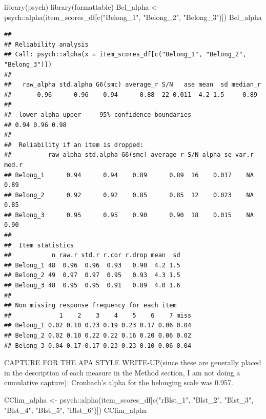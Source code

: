 \documentclass[
  11pt,
]{book}
\newenvironment{Shaded}{\begin{snugshade}}{\end{snugshade}}
\newcommand{\FunctionTok}[1]{\textcolor[rgb]{0.00,0.00,0.00}{#1}}
\newcommand{\NormalTok}[1]{#1}
\newcommand{\OtherTok}[1]{\textcolor[rgb]{0.56,0.35,0.01}{#1}}
\newcommand{\SpecialCharTok}[1]{\textcolor[rgb]{0.00,0.00,0.00}{#1}}
\newcommand{\StringTok}[1]{\textcolor[rgb]{0.31,0.60,0.02}{#1}}
\begin{document}
\begin{Shaded}
\begin{Highlighting}[]
\FunctionTok{library}\NormalTok{(psych)}
\FunctionTok{library}\NormalTok{(formattable)}
\NormalTok{Bel\_alpha }\OtherTok{\textless{}{-}}\NormalTok{ psych}\SpecialCharTok{::}\FunctionTok{alpha}\NormalTok{(item\_scores\_df[}\FunctionTok{c}\NormalTok{(}\StringTok{"Belong\_1"}\NormalTok{, }\StringTok{"Belong\_2"}\NormalTok{, }\StringTok{"Belong\_3"}\NormalTok{)])}
\NormalTok{Bel\_alpha}
\end{Highlighting}
\end{Shaded}

\begin{verbatim}
## 
## Reliability analysis   
## Call: psych::alpha(x = item_scores_df[c("Belong_1", "Belong_2", "Belong_3")])
## 
##   raw_alpha std.alpha G6(smc) average_r S/N   ase mean  sd median_r
##       0.96      0.96    0.94      0.88  22 0.011  4.2 1.5     0.89
## 
##  lower alpha upper     95% confidence boundaries
## 0.94 0.96 0.98 
## 
##  Reliability if an item is dropped:
##          raw_alpha std.alpha G6(smc) average_r S/N alpha se var.r med.r
## Belong_1      0.94      0.94    0.89      0.89  16    0.017    NA  0.89
## Belong_2      0.92      0.92    0.85      0.85  12    0.023    NA  0.85
## Belong_3      0.95      0.95    0.90      0.90  18    0.015    NA  0.90
## 
##  Item statistics 
##           n raw.r std.r r.cor r.drop mean  sd
## Belong_1 48  0.96  0.96  0.93   0.90  4.2 1.5
## Belong_2 49  0.97  0.97  0.95   0.93  4.3 1.5
## Belong_3 48  0.95  0.95  0.91   0.89  4.0 1.6
## 
## Non missing response frequency for each item
##             1    2    3    4    5    6    7 miss
## Belong_1 0.02 0.10 0.23 0.19 0.23 0.17 0.06 0.04
## Belong_2 0.02 0.10 0.22 0.22 0.16 0.20 0.06 0.02
## Belong_3 0.04 0.17 0.17 0.23 0.23 0.10 0.06 0.04
\end{verbatim}

CAPTURE FOR THE APA STYLE WRITE-UP(since these are generally placed in the description of each measure in the Method section, I am not doing a cumulative capture): Cronbach's alpha for the belonging scale was 0.957.

\begin{Shaded}
\begin{Highlighting}[]
\NormalTok{CClim\_alpha }\OtherTok{\textless{}{-}}\NormalTok{ psych}\SpecialCharTok{::}\FunctionTok{alpha}\NormalTok{(item\_scores\_df[}\FunctionTok{c}\NormalTok{(}\StringTok{"rBlst\_1"}\NormalTok{, }\StringTok{"Blst\_2"}\NormalTok{, }\StringTok{"Blst\_3"}\NormalTok{, }\StringTok{"Blst\_4"}\NormalTok{, }\StringTok{"Blst\_5"}\NormalTok{, }\StringTok{"Blst\_6"}\NormalTok{)])}
\NormalTok{CClim\_alpha}
\end{Highlighting}
\end{Shaded}
\end{document}
